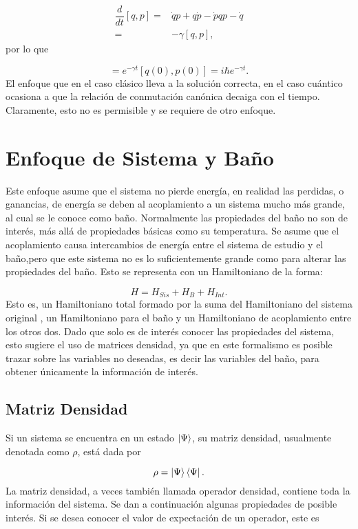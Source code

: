 \documentclass[a4paper,10pt]{report}
\begin{document}
\begin{align*}
 \dfrac{d}{dt}[q,p] =& \dot{q}p + q\dot{p} - \dot{p}q p-\dot{q}\\  
 =& -\gamma[q,p],
\end{align*}por lo que

\begin{equation}
[q(t),p(t)] = e^{-\gamma t}[q(0),p(0)] = i\hbar e^{-\gamma t}.
\end{equation} El enfoque que en el caso clásico lleva a la solución correcta, en el caso cuántico ocasiona a que la relación de conmutación canónica decaiga con el tiempo. Claramente, esto no es permisible y se requiere de otro enfoque.

\section{Enfoque de Sistema y Baño}

Este enfoque asume que el sistema no pierde energía, en realidad las perdidas, o ganancias, de energía se deben al acoplamiento a un sistema mucho más grande, al cual se le conoce como baño. Normalmente las propiedades del baño no son de interés, más allá de propiedades básicas como su temperatura. Se asume que el acoplamiento causa intercambios de energía entre el sistema de estudio y el baño,pero que este sistema no es lo suficientemente grande como para alterar las propiedades del baño. Esto se representa con un Hamiltoniano de la forma:

\begin{equation} \label{BathSysH}
H = H_{Sis} + H_{B} + H_{Int}.
\end{equation} Esto es, un Hamiltoniano total formado por la suma del Hamiltoniano del sistema original , un Hamiltoniano para el baño y un Hamiltoniano de acoplamiento entre los otros dos.  Dado que solo es de interés conocer las propiedades del sistema, esto sugiere el uso de matrices densidad, ya que en este formalismo es posible trazar sobre las variables no deseadas, es decir las variables del baño, para obtener únicamente la información de interés.

\subsection{Matriz Densidad}

Si un sistema se encuentra en un estado $\Ket{\Psi}$, su matriz densidad\cite{BlumDM}, usualmente denotada como $\rho$, está dada por

\begin{equation}
\rho = \Ket{\Psi}\Bra{\Psi}.
\end{equation} La matriz densidad, a veces también llamada operador densidad, contiene toda la información del sistema. Se dan a continuación algunas propiedades de posible interés. Si se desea conocer el valor de expectación de un operador, este es
\end{document}
